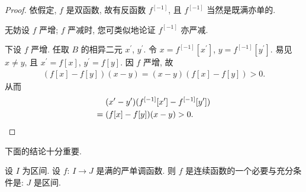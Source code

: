 \begin{proof}
    依假定, $f$ 是双函数,
    故有反函数 $f^{[-1]}$,
    且 $f^{[-1]}$ 当然是既满亦单的.

    无妨设 $f$ 严增;
    $f$ 严减时, 您可类似地论证 $f^{[-1]}$ 亦严减.

    下设 $f$ 严增.
    任取 $B$ 的相异二元 $x^{\prime}$, $y^{\prime}$.
    令 $x = f^{[-1]} [x^{\prime}]$,
    $y = f^{[-1]} [y^{\prime}]$.
    易见 $x \neq y$, 且
    $x^{\prime} = f[x]$, $y^{\prime} = f[y]$.
    因 $f$ 严增, 故
    \begin{align*}
        (f[x] - f[y])(x - y) = (x - y)(f[x] - f[y]) > 0.
    \end{align*}
    从而
    \begin{align*}
             & (x^{\prime} - y^{\prime})(f^{[-1]} [x^{\prime}] - f^{[-1]} [y^{\prime}]) \\
        = {} & (f[x] - f[y])(x - y) > 0. \qedhere
    \end{align*}
\end{proof}

下面的结论十分重要.

\begin{theorem}
    设 $I$ 为区间.
    设 $f$: $I \to J$ 是满的严单调函数.
    则 $f$ 是连续函数的一个必要与充分条件是:
    $J$ 是区间.
\end{theorem}


